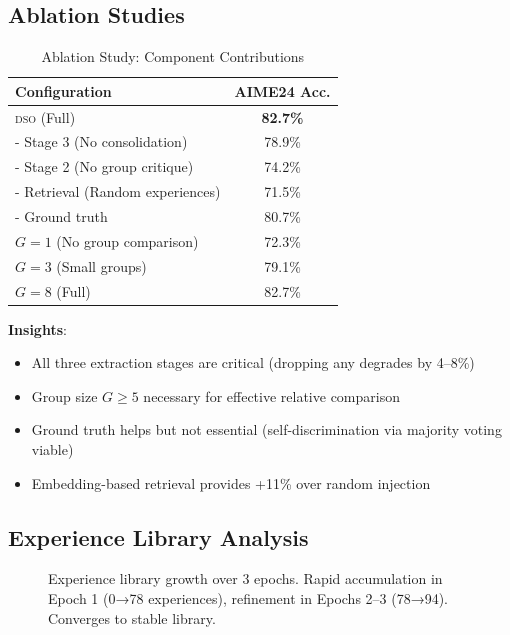 \documentclass[11pt,letterpaper]{article}
\newcommand{\DSO}{\textsc{dso}}
\begin{document}
\subsection{Ablation Studies}

\begin{table}[t]
\centering
\caption{Ablation Study: Component Contributions}
\label{tab:ablation}
\begin{tabular}{lc}
\toprule
\textbf{Configuration} & \textbf{AIME24 Acc.} \\
\midrule
\DSO{} (Full) & \textbf{82.7\%} \\
\quad - Stage 3 (No consolidation) & 78.9\% \\
\quad - Stage 2 (No group critique) & 74.2\% \\
\quad - Retrieval (Random experiences) & 71.5\% \\
\quad - Ground truth & 80.7\% \\
$G=1$ (No group comparison) & 72.3\% \\
$G=3$ (Small groups) & 79.1\% \\
$G=8$ (Full) & 82.7\% \\
\bottomrule
\end{tabular}
\end{table}

\textbf{Insights}:
\begin{itemize}
    \item All three extraction stages are critical (dropping any degrades by 4--8\%)
    \item Group size $G \geq 5$ necessary for effective relative comparison
    \item Ground truth helps but not essential (self-discrimination via majority voting viable)
    \item Embedding-based retrieval provides +11\% over random injection
\end{itemize}

\subsection{Experience Library Analysis}

\begin{figure}[t]
\centering
\caption{Experience library growth over 3 epochs. Rapid accumulation in Epoch 1 (0→78 experiences), refinement in Epochs 2--3 (78→94). Converges to stable library.}
\label{fig:growth}
\end{figure}
\end{document}
